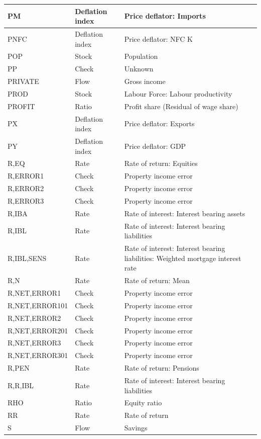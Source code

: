 \documentclass[
]{book}
\begin{document}
\begin{tabular}[t]{l|l|l}
\hline
PM & Deflation index & Price deflator: Imports\\
\hline
PNFC & Deflation index & Price deflator: NFC K\\
\hline
POP & Stock & Population\\
\hline
PP & Check & Unknown\\
\hline
PRIVATE & Flow & Gross income\\
\hline
PROD & Stock & Labour Force: Labour productivity\\
\hline
PROFIT & Ratio & Profit share (Residual of wage share)\\
\hline
PX & Deflation index & Price deflator: Exports\\
\hline
PY & Deflation index & Price deflator: GDP\\
\hline
R,EQ & Rate & Rate of return: Equities\\
\hline
R,ERROR1 & Check & Property income error\\
\hline
R,ERROR2 & Check & Property income error\\
\hline
R,ERROR3 & Check & Property income error\\
\hline
R,IBA & Rate & Rate of interest: Interest bearing assets\\
\hline
R,IBL & Rate & Rate of interest: Interest bearing liabilities\\
\hline
R,IBL,SENS & Rate & Rate of interest: Interest bearing liabilities: Weighted mortgage interest rate\\
\hline
R,N & Rate & Rate of return: Mean\\
\hline
R,NET,ERROR1 & Check & Property income error\\
\hline
R,NET,ERROR101 & Check & Property income error\\
\hline
R,NET,ERROR2 & Check & Property income error\\
\hline
R,NET,ERROR201 & Check & Property income error\\
\hline
R,NET,ERROR3 & Check & Property income error\\
\hline
R,NET,ERROR301 & Check & Property income error\\
\hline
R,PEN & Rate & Rate of return: Pensions\\
\hline
R,R,IBL & Rate & Rate of interest: Interest bearing liabilities\\
\hline
RHO & Ratio & Equity ratio\\
\hline
RR & Rate & Rate of return\\
\hline
S & Flow & Savings\\

\end{tabular}
\end{document}
